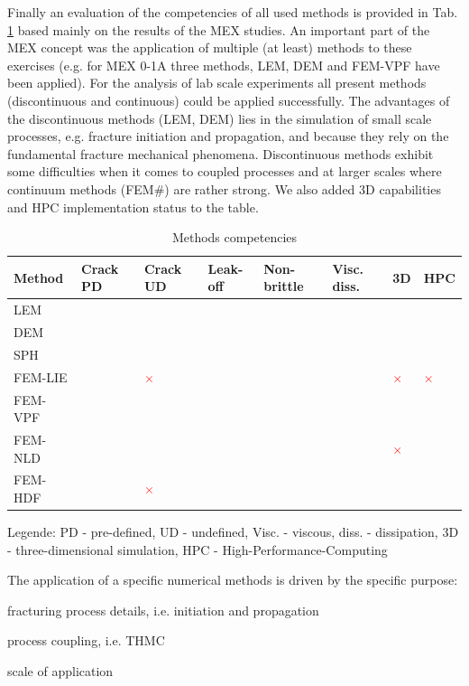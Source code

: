 Finally an evaluation of the competencies of all used methods is provided in Tab. \ref{tab:competencies} based mainly on the results of the MEX studies.
An important part of the MEX concept was the application of multiple (at least) methods to these exercises (e.g. for MEX 0-1A three methods, LEM, DEM and FEM-VPF have been applied). For the analysis of lab scale experiments all present methods (discontinuous and continuous) could be applied successfully. The advantages of the discontinuous methods (LEM, DEM) lies in the simulation of small scale processes, e.g. fracture initiation and propagation, and because they rely on the fundamental fracture mechanical phenomena. Discontinuous methods exhibit some difficulties when it comes to coupled processes and at larger scales where continuum methods (FEM\#) are rather strong. We also added 3D capabilities and HPC implementation status to the table.

\newcommand{\done}{\textcolor{green}{\checkmark}}
\newcommand{\perh}{\textcolor{orange}{\checkmark}}
\newcommand{\none}{\textcolor{red}{$\times$}}
\begin{table}[h!]
\centering
\caption{Methods competencies}
\label{tab:competencies}
\footnotesize
\begin{tabular}{llllllll}
\hline
Method  & Crack PD & Crack UD & Leak-off & Non-brittle & Visc. diss. & 3D & HPC \\
\hline
LEM     & \done & \done & \done & \done & \done & \done & \perh \\
DEM     & \done & \done & \perh & \done & \done & \perh & \done \\
SPH     & \done & \perh & \done & \perh & \done & \done & \done \\
FEM-LIE & \done & \none & \done & \done & \perh & \none & \none \\
FEM-VPF & \done & \done & \done & \done & \perh & \done & \done \\
FEM-NLD & \done & \done & \perh & \done & \perh & \none & \done \\
FEM-HDF & \done & \none & \done & \perh & \done & \done & \perh \\
\hline
\end{tabular}
\end{table}
\vspace{-5mm}
\tiny Legende: PD - pre-defined, UD - undefined, Visc. - viscous, diss. - dissipation, 3D - three-dimensional simulation, HPC - High-Performance-Computing 
\normalsize

\bigskip
The application of a specific numerical methods is driven by the specific purpose:
\begin{list}{-}{\leftmargin=1em \itemindent=0em \itemsep=0em}
\item fracturing process details, i.e. initiation and propagation
\item process coupling, i.e. THMC
\item scale of application
\end{list}

